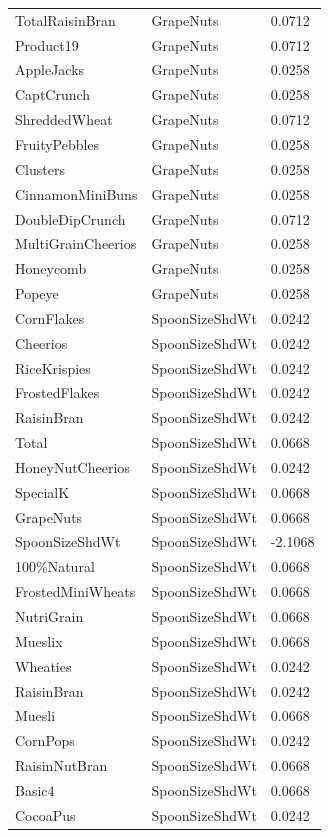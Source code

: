 \begin{table}[!htbp]
\begin{tabular}{lll}
\\
TotalRaisinBran & GrapeNuts & 0.0712
\\
Product19 & GrapeNuts & 0.0712
\\
AppleJacks & GrapeNuts & 0.0258
\\
CaptCrunch & GrapeNuts & 0.0258
\\
ShreddedWheat & GrapeNuts & 0.0712
\\
FruityPebbles & GrapeNuts & 0.0258
\\
Clusters & GrapeNuts & 0.0258
\\
CinnamonMiniBuns & GrapeNuts & 0.0258
\\
DoubleDipCrunch & GrapeNuts & 0.0712
\\
MultiGrainCheerios & GrapeNuts & 0.0258
\\
Honeycomb & GrapeNuts & 0.0258
\\
Popeye & GrapeNuts & 0.0258
\\
CornFlakes & SpoonSizeShdWt & 0.0242
\\
Cheerios & SpoonSizeShdWt & 0.0242
\\
RiceKrispies & SpoonSizeShdWt & 0.0242
\\
FrostedFlakes & SpoonSizeShdWt & 0.0242
\\
RaisinBran & SpoonSizeShdWt & 0.0242
\\
Total & SpoonSizeShdWt & 0.0668
\\
HoneyNutCheerios & SpoonSizeShdWt & 0.0242
\\
SpecialK & SpoonSizeShdWt & 0.0668
\\
GrapeNuts & SpoonSizeShdWt & 0.0668
\\
SpoonSizeShdWt & SpoonSizeShdWt & -2.1068
\\
100\%Natural & SpoonSizeShdWt & 0.0668
\\
FrostedMiniWheats & SpoonSizeShdWt & 0.0668
\\
NutriGrain & SpoonSizeShdWt & 0.0668
\\
Mueslix & SpoonSizeShdWt & 0.0668
\\
Wheaties & SpoonSizeShdWt & 0.0242
\\
RaisinBran & SpoonSizeShdWt & 0.0242
\\
Muesli & SpoonSizeShdWt & 0.0668
\\
CornPops & SpoonSizeShdWt & 0.0242
\\
RaisinNutBran & SpoonSizeShdWt & 0.0668
\\
Basic4 & SpoonSizeShdWt & 0.0668
\\
CocoaPus & SpoonSizeShdWt & 0.0242

\end{tabular}
\end{table}
